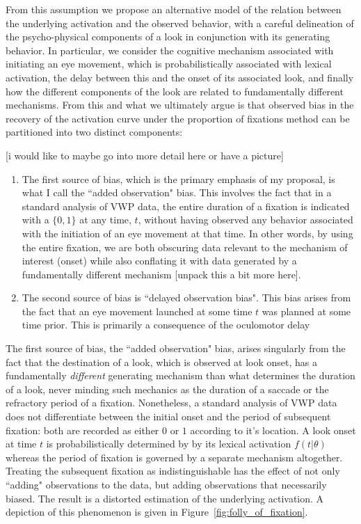 \documentclass{article}
\begin{document}
From this assumption we propose an alternative model of the relation between the underlying activation and the observed behavior, with a careful delineation of the psycho-physical components of a look in conjunction with its generating behavior. In particular, we consider the cognitive mechanism associated with initiating an eye movement, which is probabilistically associated with lexical activation, the delay between this and the onset of its associated look, and finally how the different components of the look are related to fundamentally different mechanisms. From this and what we ultimately argue is that observed bias in the recovery of the activation curve under the proportion of fixations method can be partitioned into two distinct components:

[i would like to maybe go into more detail here or have a picture]

\begin{enumerate}
\item The first source of bias, which is the primary emphasis of my proposal, is what I call the ``added observation" bias. This involves the fact that in  a standard analysis of VWP data, the entire duration of a fixation is indicated with a $\{0,1\}$  at any time, $t$, without having observed any behavior associated with the initiation of an eye movement at that time. In other words, by using the entire fixation, we are both obscuring data relevant to the mechanism of interest (onset) while also conflating it with data generated by a fundamentally different mechanism [unpack this a bit more here].
\item The second source of bias is ``delayed observation bias". This bias arises from the fact that an eye movement launched at some time $t$ was planned at some time prior. This is primarily a consequence of the oculomotor delay
\end{enumerate}

The first source of bias, the ``added observation" bias, arises singularly from the fact that the destination of a look, which is observed at look onset, has a fundamentally \textit{different} generating mechanism than what determines the duration of a look, never minding such mechanics as the duration of a saccade or the refractory period of a fixation. Nonetheless, a standard analysis of VWP data does not differentiate between the initial onset and the period of subsequent fixation: both are recorded as either $0$ or $1$ according to it's location. A look onset at time $t$ is probabilistically determined by by its lexical activation $f(t|\theta)$ whereas the period of fixation is governed by a separate mechanism altogether. Treating the subsequent fixation as indistinguishable has the effect of not only ``adding" observations to the data, but adding observations that necessarily biased. The result is a distorted estimation of the underlying activation. A depiction of this phenomenon is given in Figure~\ref{fig:folly_of_fixation}. 
\end{document}
